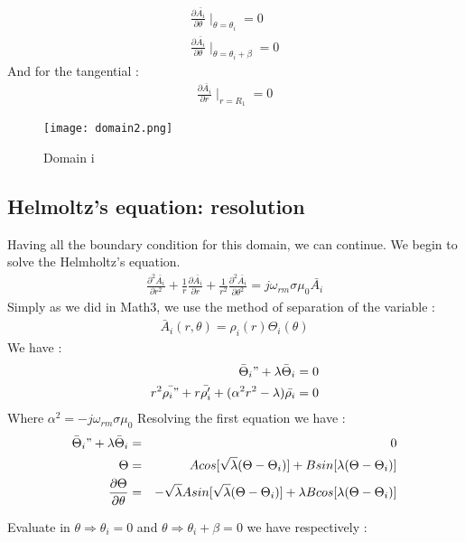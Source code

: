 \begin{eqnarray}
    \frac{\partial\bar{A_i}}{\partial\theta}{\mid_{\theta = \theta_i}} = 0\\
    \frac{\partial\bar{A_i}}{\partial\theta}{\mid_{\theta = \theta_i+\beta}} = 0
\end{eqnarray}
And for the tangential : 
\begin{eqnarray}
\frac{\partial\bar{A_i}}{\partial r}{\mid_{r = R_1}} = 0
\end{eqnarray}

\begin{figure}[H]
    \centering
    \texttt{[image: domain2.png]}
    \caption{Domain i}   
    \label{fig:domain2}
\end{figure}
\subsection{Helmoltz's equation: resolution}
Having all the boundary condition for this domain, we can continue. We begin to solve the Helmholtz's equation.
\begin{eqnarray}
\frac{\partial^2 \bar{A_i}}{\partial r^2} + \frac{1}{r} \frac{\partial \bar{A_i}}{\partial r} + \frac{1}{r^2}\frac{\partial^2 \bar{A_i}}{\partial \theta^2} = j \omega_{rm}\sigma\mu_0\bar{A_i}
\end{eqnarray}
Simply as we did in Math3, we use the method of separation of the variable :
\begin{eqnarray}
\bar{A}_i(r,\theta) = \rho_i(r) \Theta_i(\theta)
\end{eqnarray}
We have : 
\begin{eqnarray}
\bar{\Theta}_i" + \lambda \bar{\Theta}_i=0\\
r^2\bar{\rho_i"}+r\bar{\rho_i'}+(\alpha^2r^2-\lambda)\bar{\rho_i}=0
\end{eqnarray}
Where $ \alpha^2 = -j\omega_{rm} \sigma \mu_0 $
Resolving the first equation we have : 
\begin{eqnarray}
\bar{\Theta}_i" + \lambda \bar{\Theta}_i&=&0\\
\Theta &=& A cos[\sqrt\lambda(\Theta-\Theta_i)]+ B sin[\lambda(\Theta-\Theta_i)]\\
\frac{\partial \Theta}{\partial \theta} &=& - \sqrt{\lambda} A sin[\sqrt\lambda(\Theta-\Theta_i)]+ \lambda B cos[\lambda(\Theta-\Theta_i)]\\
\end{eqnarray}

Evaluate in $\theta \Rightarrow \theta_i = 0 $ and $\theta \Rightarrow \theta_i + \beta = 0 $ we have respectively :


